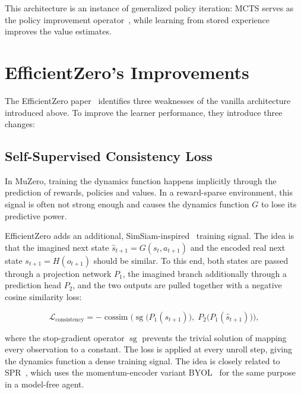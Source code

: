 This architecture is an instance of generalized policy iteration:
MCTS serves as the policy improvement operator~\cite{grill_monte-carlo_2020}, while learning from stored experience
improves the value estimates.

\section{EfficientZero's Improvements}\label{sec:ez-improvements}

The EfficientZero paper~\cite{ye_mastering_2021} identifies three weaknesses
of the vanilla architecture introduced above.
To improve the learner performance, they introduce three changes:

\subsection{Self-Supervised Consistency Loss}\label{sec:ez-consistency}

In MuZero, training the dynamics function happens implicitly through the prediction
of rewards, policies and values.
In a reward-sparse environment, this signal is often not strong enough and causes
the dynamics function $G$ to lose its predictive power.

EfficientZero adds an additional, SimSiam-inspired~\cite{chen_exploring_2020}
training signal.
The idea is that the imagined next state $\hat{s}_{t+1}=G(s_t,a_{t+1})$ and the encoded
real next state $s_{t+1}=H(o_{t+1})$ should be similar.
To this end, both states are passed through a projection network $P_1$, the imagined
branch additionally through a prediction head $P_2$, and the two outputs are pulled
together with a negative cosine similarity loss:

\begin{equation}\label{eq:ez-consistency}
  \mathcal{L}_{\text{consistency}}
  = -\operatorname{cossim}\!\Big(
      \operatorname{sg}\big(P_1(s_{t+1})\big),\;
      P_2\big(P_1(\hat{s}_{t+1})\big)
    \Big),
\end{equation}

where the stop-gradient operator $\operatorname{sg}$ prevents the trivial
solution of mapping every observation to a constant.
The loss is applied at every unroll step, giving the dynamics function a dense
training signal.
The idea is closely related to SPR~\cite{schwarzer_data-efficient_2021}, which
uses the momentum-encoder variant BYOL~\cite{grill_bootstrap_2020} for the
same purpose in a model-free agent.

